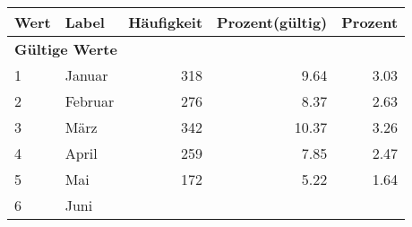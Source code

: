      \begin{longtable}{lXrrr}
     \toprule
     \textbf{Wert} & \textbf{Label} & \textbf{Häufigkeit} & \textbf{Prozent(gültig)} & \textbf{Prozent} \\
     \endhead
     \midrule
     \multicolumn{5}{l}{\textbf{Gültige Werte}}\\

     1 &
     \multicolumn{1}{X}{ Januar   } &


       \num{318} &
       \num[round-mode=places,round-precision=2]{9,64} &
         \num[round-mode=places,round-precision=2]{3,03} \\

     2 &
     \multicolumn{1}{X}{ Februar   } &


       \num{276} &
       \num[round-mode=places,round-precision=2]{8,37} &
         \num[round-mode=places,round-precision=2]{2,63} \\

     3 &
     \multicolumn{1}{X}{ März   } &


       \num{342} &
       \num[round-mode=places,round-precision=2]{10,37} &
         \num[round-mode=places,round-precision=2]{3,26} \\

     4 &
     \multicolumn{1}{X}{ April   } &


       \num{259} &
       \num[round-mode=places,round-precision=2]{7,85} &
         \num[round-mode=places,round-precision=2]{2,47} \\

     5 &
     \multicolumn{1}{X}{ Mai   } &


       \num{172} &
       \num[round-mode=places,round-precision=2]{5,22} &
         \num[round-mode=places,round-precision=2]{1,64} \\

     6 &
     \multicolumn{1}{X}{ Juni   } &



\end{longtable}
